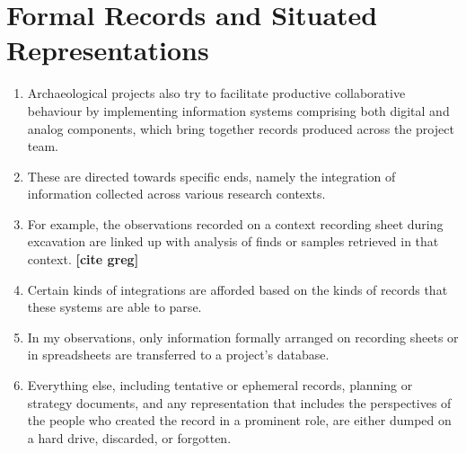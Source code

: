 \documentclass[12pt]{article}
\begin{document}
\section{Formal Records and Situated Representations}
\begin{enumerate}
  \item Archaeological projects also try to facilitate productive collaborative behaviour by implementing information systems comprising both digital and analog components, which bring together records produced across the project team.
  \item These are directed towards specific ends, namely the integration of information collected across various research contexts.
  \item For example, the observations recorded on a context recording sheet during excavation are linked up with analysis of finds or samples retrieved in that context. \textbf{[cite greg]}
  \item Certain kinds of integrations are afforded based on the kinds of records that these systems are able to parse.
  \item In my observations, only information formally arranged on recording sheets or in spreadsheets are transferred to a project's database.
  \item Everything else, including tentative or ephemeral records, planning or strategy documents, and any representation that includes the perspectives of the people who created the record in a prominent role, are either dumped on a hard drive, discarded, or forgotten.
\end{enumerate}
\end{document}
